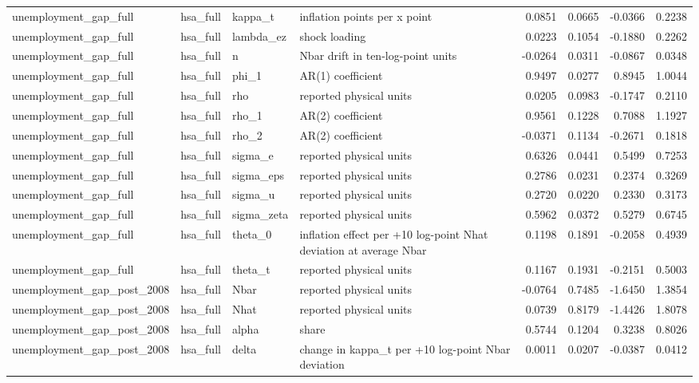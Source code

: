 \begin{tabular}{llllrrrr}
unemployment\_gap\_full & hsa\_full & kappa\_t & inflation points per x point & 0.0851 & 0.0665 & -0.0366 & 0.2238 \\
unemployment\_gap\_full & hsa\_full & lambda\_ez & shock loading & 0.0223 & 0.1054 & -0.1880 & 0.2262 \\
unemployment\_gap\_full & hsa\_full & n & Nbar drift in ten-log-point units & -0.0264 & 0.0311 & -0.0867 & 0.0348 \\
unemployment\_gap\_full & hsa\_full & phi\_1 & AR(1) coefficient & 0.9497 & 0.0277 & 0.8945 & 1.0044 \\
unemployment\_gap\_full & hsa\_full & rho & reported physical units & 0.0205 & 0.0983 & -0.1747 & 0.2110 \\
unemployment\_gap\_full & hsa\_full & rho\_1 & AR(2) coefficient & 0.9561 & 0.1228 & 0.7088 & 1.1927 \\
unemployment\_gap\_full & hsa\_full & rho\_2 & AR(2) coefficient & -0.0371 & 0.1134 & -0.2671 & 0.1818 \\
unemployment\_gap\_full & hsa\_full & sigma\_e & reported physical units & 0.6326 & 0.0441 & 0.5499 & 0.7253 \\
unemployment\_gap\_full & hsa\_full & sigma\_eps & reported physical units & 0.2786 & 0.0231 & 0.2374 & 0.3269 \\
unemployment\_gap\_full & hsa\_full & sigma\_u & reported physical units & 0.2720 & 0.0220 & 0.2330 & 0.3173 \\
unemployment\_gap\_full & hsa\_full & sigma\_zeta & reported physical units & 0.5962 & 0.0372 & 0.5279 & 0.6745 \\
unemployment\_gap\_full & hsa\_full & theta\_0 & inflation effect per +10 log-point Nhat deviation at average Nbar & 0.1198 & 0.1891 & -0.2058 & 0.4939 \\
unemployment\_gap\_full & hsa\_full & theta\_t & reported physical units & 0.1167 & 0.1931 & -0.2151 & 0.5003 \\
unemployment\_gap\_post\_2008 & hsa\_full & Nbar & reported physical units & -0.0764 & 0.7485 & -1.6450 & 1.3854 \\
unemployment\_gap\_post\_2008 & hsa\_full & Nhat & reported physical units & 0.0739 & 0.8179 & -1.4426 & 1.8078 \\
unemployment\_gap\_post\_2008 & hsa\_full & alpha & share & 0.5744 & 0.1204 & 0.3238 & 0.8026 \\
unemployment\_gap\_post\_2008 & hsa\_full & delta & change in kappa\_t per +10 log-point Nbar deviation & 0.0011 & 0.0207 & -0.0387 & 0.0412 \\

\end{tabular}
